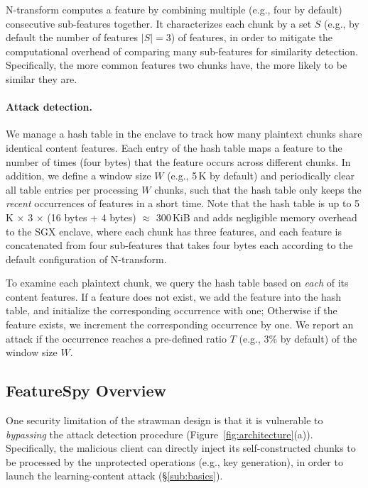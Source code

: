 N-transform computes a feature by combining multiple (e.g., four by default) consecutive sub-features together. It characterizes each chunk by a set $S$ (e.g., by default the number of features $|S| = 3$) of features, in order to mitigate the computational overhead of comparing many sub-features for similarity detection. Specifically, the more common features two chunks have, the more likely to be similar they are.


\paragraph{Attack detection.}
We manage a hash table in the enclave to track how many plaintext chunks share identical content features. Each entry of the hash table maps a feature to the number of times (four bytes) that the feature occurs across different chunks.
 In addition,
we define a window size $W$ (e.g., 5\,K by default) and periodically clear all table entries per processing $W$ chunks, such that the hash table only keeps the {\em recent} occurrences of features in a short time. Note that the hash table is up to 5\,K $\times$ 3 $\times$ (16 bytes + 4 bytes) $\approx$ 300\,KiB and adds negligible memory overhead to the SGX enclave, where each chunk has three features, and each feature is concatenated from four sub-features that takes four bytes each according to the default configuration of N-transform.

To examine each plaintext chunk, we query the hash table based on {\em each} of its content features. If a feature does not exist, we add the feature  into the hash table, and initialize the corresponding occurrence with one; Otherwise if the feature exists, we increment the corresponding occurrence by one. We report an attack if the occurrence reaches a pre-defined ratio $T$ (e.g., 3\% by default) of the window size $W$.




\subsection{FeatureSpy Overview}
\label{sub:secure_design}

One security limitation of the strawman design is that it is vulnerable to {\em bypassing} the attack detection procedure (Figure~\ref{fig:architecture}(a)). Specifically, the malicious client can directly inject its self-constructed chunks to be processed by the unprotected operations (e.g., key generation), in order to launch the learning-content attack (\S\ref{sub:basics}).


